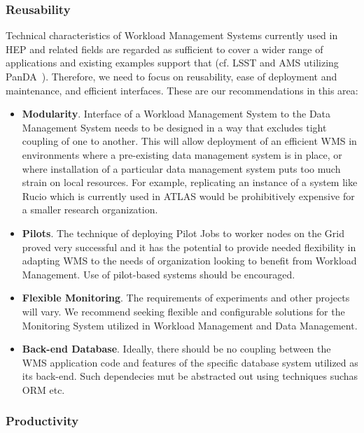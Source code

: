 \subsubsection{Reusability}
Technical characteristics of Workload Management Systems currently used in HEP and related fields are regarded
as sufficient to cover a wider range of applications and existing examples support that (cf. LSST and AMS utilizing PanDA~\cite{pandamon_isgc14}).
Therefore, we need to focus on reusability, ease of deployment and maintenance, and efficient interfaces. These are our recommendations in this area:

\begin{itemize}

\item \textbf{Modularity}. Interface of a Workload Management System to the Data Management System needs to be designed in a way that
excludes tight coupling of one to another. This will allow deployment of an efficient WMS in environments where a pre-existing data management  system
is in place, or where installation of a particular data management system puts too much strain on local resources. For example, replicating an instance
of a system like Rucio which is currently used in ATLAS would be prohibitively expensive for a smaller research organization.

\item \textbf{Pilots}. The technique of deploying Pilot Jobs to worker nodes on the Grid proved very successful and it has the potential to provide needed
flexibility in adapting WMS to the needs of organization looking to benefit from Workload Management. Use of pilot-based systems should be encouraged.

\item \textbf{Flexible Monitoring}. The requirements of experiments and other projects will vary. We recommend seeking flexible and configurable solutions
for the Monitoring System utilized in Workload Management and Data Management.

\item \textbf{Back-end Database}. Ideally, there should be no coupling between the WMS application code and features of the specific database system
utilized as its back-end. Such dependecies mut be abstracted out using techniques suchas ORM etc.

\end{itemize}

\subsubsection{Productivity}

